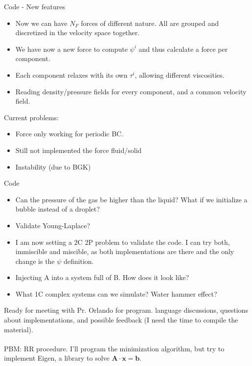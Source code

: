 \documentclass[8pt]{beamer}
\begin{document}
	\begin{frame}{Code - New features}
		\begin{itemize}
			\item Now we can have $N_F$ forces of different nature. All are grouped and discretized in the velocity space together.
			\item We have now a new force to compute $\psi^i$ and thus calculate a force per component.
			\item Each component relaxes with its own $\tau^i$, allowing different viscosities.
			\item Reading density/pressure fields for every component, and a common velocity field.
		\end{itemize}
		Current problems:
		\begin{itemize}
			\item Force only working for periodic BC.
			\item Still not implemented the force fluid/solid
			\item Instability (due to BGK)
		\end{itemize}
		 
	\end{frame}
	
	\begin{frame}{Code}
		\begin{itemize}
		\item Can the pressure of the gas be higher than the liquid? What if we initialize a bubble instead of a droplet?
		\item Validate Young-Laplace?
		\item I am now setting a 2C 2P problem to validate the code. I can try both, immiscible and miscible, as both implementations are there and the only change is the $\psi$ definition.
		\item Injecting A into a system full of B. How does it look like?
		\item What 1C complex systems can we simulate? Water hammer effect?
		\end{itemize}
		Ready for meeting with Pr. Orlando for program. language discussions, questions about implementations, and possible feedback (I need the time to compile the material).\\~\\
		
		PBM: RR procedure. I'll program the minimization algorithm, but try to implement Eigen, a library to solve $\mathbf{A \cdot x} = \mathbf{b}$.
	\end{frame}
	
\end{document}
